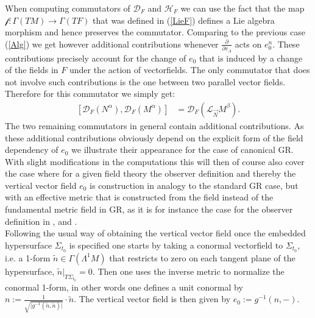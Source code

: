 \documentclass[a4paper,12pt, DIV=14, BCOR=5mm, twoside, headsepline]{scrbook}
\begin{document}
When computing commutators of $\mathcal{D}_F$ and $\mathcal{H}_F$ we can use the fact that the map $\mathcal{f}: \Gamma(TM) \rightarrow \Gamma(TF)$ that was defined in (\ref{LieF}) defines a Lie algebra morphism and hence preserves the commutator.
Comparing to the previous case (\ref{Alg}) we get however additional contributions whenever $\frac{\partial}{\partial v_A}$ acts on $e_0^n$. These contributions precisely account for the change of $e_0$ that is induced by a change of the fields in $F$ under the action of vectorfields. The only commutator that does not involve such contributions is the one between two parallel vector fields. Therefore for this commutator we simply get:
\begin{align}\label{FDD}
    \left [ \mathcal{D}_F(N^{\alpha}), \mathcal{D}_F(M^{\alpha})\right ] &= \mathcal{D}_F(\mathcal{L}_{\vec{N}}M^{\beta}).
\end{align}
The two remaining commutators in general contain additional contributions. As these additional contributions obviously depend on the explicit form of the field dependency of $e_0$ we illustrate their appearance for the case of canonical GR. With slight modifications in the computations this will then of course also cover the case where for a given field theory the observer definition and thereby the vertical vector field $e_0$ is construction in analogy to the standard GR case, but with an effective metric that is constructed from the field instead of the fundamental metric field in GR, as it is for instance the case for the observer definition in \cite{2018PhRvD..97h4036D}, \cite{2011PhRvD..83d4047R} and \cite{Rivera}.\\

Following the usual way of obtaining the vertical vector field once the embedded hypersurface $\Sigma_{t_0}$ is specified one starts by taking a conormal vectorfield to $\Sigma_{t_0}$, i.e. a 1-form $\tilde{n} \in \Gamma(\Lambda^1M)$ that restricts to zero on each tangent plane of the hypersurface, $\tilde{n} \vert_{T\Sigma_{t_0}} = 0$. Then one uses the inverse metric to normalize the conormal 1-form, in other words one defines a unit conormal by $n := \frac{1}{\sqrt{ \vert g^{-1}(\tilde{n},\tilde{n}) \vert }} \cdot \tilde{n}$. The vertical vector field is then given by $e_0 := g^{-1}(n, - )$. 
\end{document}
